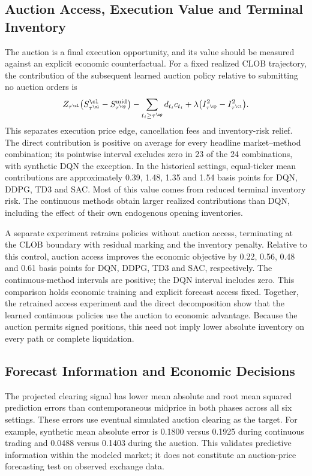 \subsection{Auction Access, Execution Value and Terminal Inventory}
\label{subsec:auction_value}
The auction is a final execution opportunity, and its value should be measured
against an explicit economic counterfactual. For a fixed realized CLOB trajectory,
the contribution of the subsequent learned auction policy relative to submitting
no auction orders is
\[
Z_{\tau^\cl}\bigl(S_{\tau^\cl}^\cl-S_{\tau^\op}^{\mathrm{mid}}\bigr)
-\sum_{t_i\geq\tau^\op}d_{t_i}c_{t_i}
+\lambda\bigl(I_{\tau^\op}^{2}-I_{\tau^\cl}^{2}\bigr).
\]
This separates execution price edge, cancellation fees and inventory-risk
relief. The direct contribution is positive on average for every headline
market--method combination; its pointwise interval excludes zero in 23 of
the 24 combinations, with synthetic DQN the exception. In the historical
settings, equal-ticker mean contributions are approximately 0.39, 1.48,
1.35 and 1.54 basis points for DQN, DDPG, TD3 and SAC. Most of this value
comes from reduced terminal inventory risk. The continuous methods obtain
larger realized contributions than DQN, including the effect of their own
endogenous opening inventories.

A separate experiment retrains policies without auction access, terminating
at the CLOB boundary with residual marking and the inventory penalty. Relative
to this control, auction access improves the economic objective by 0.22,
0.56, 0.48 and 0.61 basis points for DQN, DDPG, TD3 and SAC, respectively.
The continuous-method intervals are positive; the DQN interval includes zero.
This comparison holds economic training and explicit forecast access fixed.
Together, the retrained access experiment and the direct decomposition show
that the learned continuous policies use the auction to economic advantage.
Because the auction permits signed positions, this need not imply lower
absolute inventory on every path or complete liquidation.

\subsection{Forecast Information and Economic Decisions}
\label{subsec:forecast_value}
The projected clearing signal has lower mean absolute and root mean squared
prediction errors than contemporaneous midprice in both phases across all
six settings. These errors use eventual simulated auction clearing as the
target. For example, synthetic mean absolute error is 0.1800 versus 0.1925
during continuous trading and 0.0488 versus 0.1403 during the auction.
This validates predictive information within the modeled market; it does
not constitute an auction-price forecasting test on observed exchange data.

